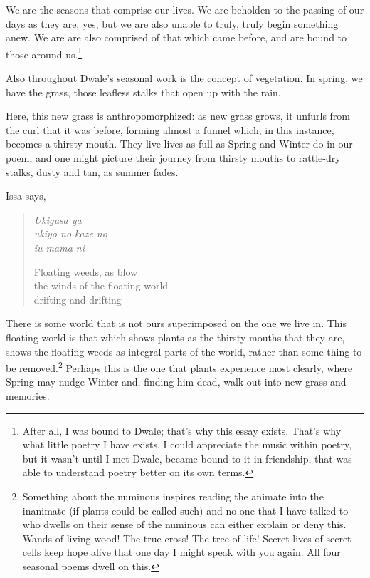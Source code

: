 \documentclass[12pt,oneside]{memoir}
\begin{document}
We are the seasons that comprise our lives. We are beholden to the passing of our days as they are, yes, but we are also unable to truly, truly begin something anew. We are are also comprised of that which came before, and are bound to those around us.\footnote{After all, I was bound to Dwale; that's why this essay exists. That's why what little poetry I have exists. I could appreciate the music within poetry, but it wasn't until I met Dwale, became bound to it in friendship, that was able to understand poetry better on its own terms.}

Also throughout Dwale's seasonal work is the concept of vegetation. In spring, we have the grass, those leafless stalks that open up with the rain.

Here, this new grass is anthropomorphized: as new grass grows, it unfurls from the curl that it was before, forming almost a funnel which, in this instance, becomes a thirsty mouth. They live lives as full as Spring and Winter do in our poem, and one might picture their journey from thirsty mouths to rattle-dry stalks, dusty and tan, as summer fades.

Issa says,

\begin{verse}
\emph{Ukigusa ya} \\
\emph{ukiyo no kaze no} \\
\emph{iu mama ni}

Floating weeds, as blow \\
the winds of the floating world --- \\
drifting and drifting

\parencite[18]{issa}
\end{verse}

There is some world that is not ours superimposed on the one we live in. This floating world is that which shows plants as the thirsty mouths that they are, shows the floating weeds as integral parts of the world, rather than some thing to be removed.\footnote{Something about the numinous inspires reading the animate into the inanimate (if plants could be called such) and no one that I have talked to who dwells on their sense of the numinous can either explain or deny this. Wands of living wood! The true cross! The tree of life! Secret lives of secret cells keep hope alive that one day I might speak with you again. All four seasonal poems dwell on this.} Perhaps this is the one that plants experience most clearly, where Spring may nudge Winter and, finding him dead, walk out into new grass and memories.
\end{document}
